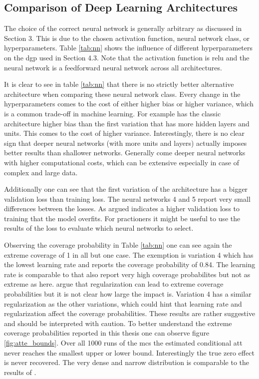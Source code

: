 \subsection{Comparison of Deep Learning Architectures}

The choice of the correct neural network is generally arbitrary as discussed in Section 3.
This is due to the chosen activation function, neural network class, or hyperparameters.
Table \ref{tab:nn} shows the influence of different hyperparameters on the \ac{dgp} used in Section 4.3.
Note that the activation function is \ac{relu} and the neural network is a feedforward neural network across all architectures.

It is clear to see in table \ref{tab:nn} that there is no strictly better alternative architecture when comparing these neural network class.
Every change in the hyperparameters comes to the cost of either higher bias or higher variance, which is a common trade-off in machine learning.
For example has the classic architecture higher bias than the first variation that has more hidden layers and units.
This comes to the cost of higher variance.
Interestingly, there is no clear sign that deeper neural networks (with more units and layers) actually imposes better results than shallower networks.
Generally come deeper neural networks with higher computational costs, which can be extensive especially in case of complex and large data.

Additionally one can see that the first variation of the architecture has a bigger validation loss than training loss.
The neural networks 4 and 5 report very small differences between the losses.
As argued indicates a higher validation loss to training that the model overfits.
For practioners it might be useful to use the results of the loss to evaluate which neural networks to select.



Observing the coverage probability in Table \ref{tab:nn} one can see again the extreme coverage of 1 in all but one case.
The exemption is variation 4 which has the lowest learning rate and reports the coverage probability of 0.84.
The learning rate is comparable to \citet{farrellDeepNeuralNetworks2021} that also report very high coverage probabilites but not as extreme as here.
\citet{farrellDeepNeuralNetworks2021} argue that regularization can lead to extreme coverage probabilities but it is not clear how large the impact is.
Variation 4 has a similar regularization as the other variations, which could hint that learning rate and regularization affect the coverage probabilities.
These results are rather suggestive and should be interpreted with caution.
To better understand the extreme coverage probabilities reported in this thesis one can observe figure \ref{fig:atte_bounds}.
Over all 1000 runs of the \ac{mcs} the estimated conditional \ac{att} never reaches the smallest upper or lower bound.
Interestingly the true zero effect is never recovered.
The very dense and narrow distribution is comparable to the results of \citet{farrellDeepNeuralNetworks2021}.

